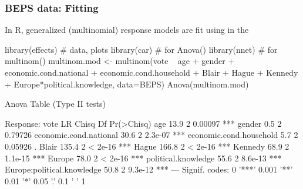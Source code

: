 \begin{frame}[fragile]
 \frametitle{BEPS data: Fitting}
In R, generalized (multinomial) response models are fit using  in the 
\begin{Rin}[baselinestretch=0.8, fontsize=\footnotesize]
library(effects)  # data, plots
library(car)      # for Anova()
library(nnet)     # for multinom()
multinom.mod <- multinom(vote ~ age + gender + economic.cond.national +
    economic.cond.household + Blair + Hague + Kennedy +
    Europe*political.knowledge, data=BEPS)
Anova(multinom.mod)
\end{Rin}
\begin{Rout}[baselinestretch=0.8, fontsize=\footnotesize]
Anova Table (Type II tests)

Response: vote
                           LR Chisq Df Pr(>Chisq)    
age                            13.9  2    0.00097 ***
gender                          0.5  2    0.79726    
economic.cond.national         30.6  2    2.3e-07 ***
economic.cond.household         5.7  2    0.05926 .  
Blair                         135.4  2    < 2e-16 ***
Hague                         166.8  2    < 2e-16 ***
Kennedy                        68.9  2    1.1e-15 ***
Europe                         78.0  2    < 2e-16 ***
political.knowledge            55.6  2    8.6e-13 ***
Europe:political.knowledge     50.8  2    9.3e-12 ***
---
Signif. codes:  0 '***' 0.001 '**' 0.01 '*' 0.05 '.' 0.1 ' ' 1 
\end{Rout}
 
\end{frame}

